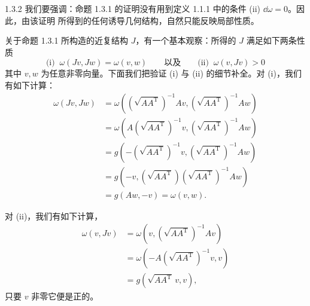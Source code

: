 \begin{wrem}{1.3.2}
我们要强调：命题 1.3.1 的证明没有用到定义 1.1.1 中的条件 (ii) $\dd\omega=0$。因此，由该证明
所得到的任何诱导几何结构，自然只能反映局部性质。
\end{wrem}

关于命题 1.3.1 所构造的近复结构 $J$，有一个基本观察：所得的 $J$ 满足如下两条性质
\begin{equation}
  \text{(i) }\ \omega(Jv,Jw)=\omega(v,w)
  \qquad\text{以及}\qquad
  \text{(ii) }\ \omega(v,Jv)>0
  \tag{1.7}
\end{equation}
其中 $v,w$ 为任意非零向量。下面我们把验证 (i) 与 (ii) 的细节补全。对 (i)，我们有如下计算：
\[
  \begin{aligned}
    \omega(Jv,Jw)&=\omega\left(\left(\sqrt{AA^{\mathrm T}}\right)^{-1}Av,
      \left(\sqrt{AA^{\mathrm T}}\right)^{-1}Aw\right)\\
    &=\omega\left(A\left(\sqrt{AA^{\mathrm T}}\right)^{-1}v,
      \left(\sqrt{AA^{\mathrm T}}\right)^{-1}Aw\right)\\
    &=g\left(-\left(\sqrt{AA^{\mathrm T}}\right)^{-1}v,
      \left(\sqrt{AA^{\mathrm T}}\right)^{-1}Aw\right)\\
    &=g\left(-v,\left(\sqrt{AA^{\mathrm T}}\right)
      \left(\sqrt{AA^{\mathrm T}}\right)^{-1}Aw\right)\\
    &=g(Aw,-v)=\omega(v,w).
  \end{aligned}
\]

对 (ii)，我们有如下计算，
\[
  \begin{aligned}
    \omega(v,Jv)&=\omega\left(v,\left(\sqrt{AA^{\mathrm T}}\right)^{-1}Av\right)\\
    &=\omega\left(-A\left(\sqrt{AA^{\mathrm T}}\right)^{-1}v,v\right)\\
    &=g\left(\sqrt{AA^{\mathrm T}}\,v,v\right),
  \end{aligned}
\]
只要 $v$ 非零它便是正的。

